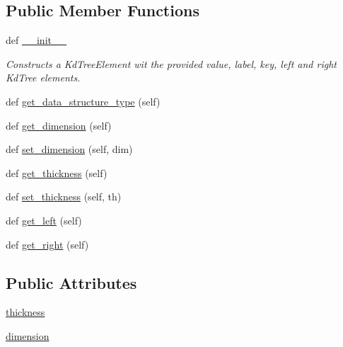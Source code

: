 \subsection*{Public Member Functions}
\begin{DoxyCompactItemize}
\item 
def \hyperlink{class_bridges_1_1kd__tree__element_1_1_k_d_tree_element_ada272bbaead31a3479c54fbbfa1ff467}{\+\_\+\+\_\+init\+\_\+\+\_\+}
\begin{DoxyCompactList}\small\item\em Constructs a Kd\+Tree\+Element wit the provided value, label, key, left and right Kd\+Tree elements. \end{DoxyCompactList}\item 
def \hyperlink{class_bridges_1_1kd__tree__element_1_1_k_d_tree_element_a2a835a57fdbcbad9f24f49421756b923}{get\+\_\+data\+\_\+structure\+\_\+type} (self)
\item 
def \hyperlink{class_bridges_1_1kd__tree__element_1_1_k_d_tree_element_a4ef9a82d8bb407f7e802fad23f0406ab}{get\+\_\+dimension} (self)
\item 
def \hyperlink{class_bridges_1_1kd__tree__element_1_1_k_d_tree_element_ae2c2dc60e110fbe64edd0e9b4a55094f}{set\+\_\+dimension} (self, dim)
\item 
def \hyperlink{class_bridges_1_1kd__tree__element_1_1_k_d_tree_element_a5148bf0c4272f62d7c055ebf2a6a6ede}{get\+\_\+thickness} (self)
\item 
def \hyperlink{class_bridges_1_1kd__tree__element_1_1_k_d_tree_element_ac100a47f4743452747c002dfda86e2b7}{set\+\_\+thickness} (self, th)
\item 
def \hyperlink{class_bridges_1_1kd__tree__element_1_1_k_d_tree_element_a0190cbbb6e52833d711be493af5bb2aa}{get\+\_\+left} (self)
\item 
def \hyperlink{class_bridges_1_1kd__tree__element_1_1_k_d_tree_element_ac02fbf728853a590d59e042110b9ce29}{get\+\_\+right} (self)
\end{DoxyCompactItemize}
\subsection*{Public Attributes}
\begin{DoxyCompactItemize}
\item 
\hyperlink{class_bridges_1_1kd__tree__element_1_1_k_d_tree_element_a530b78c2dcb601a9345b195c1b882d30}{thickness}
\item 
\hyperlink{class_bridges_1_1kd__tree__element_1_1_k_d_tree_element_ab5457d652eacbce763c8760b512ac7d7}{dimension}
\end{DoxyCompactItemize}


